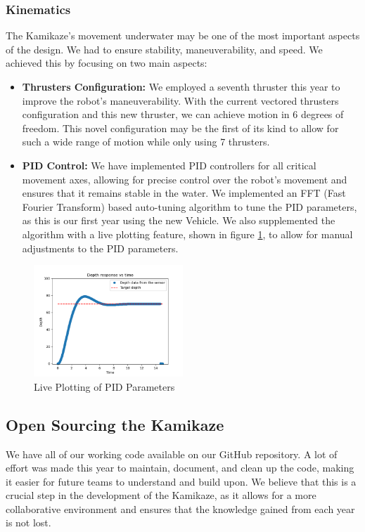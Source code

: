 \subsubsection{Kinematics}
The Kamikaze's movement underwater may be one of the most important aspects of
the design. We had to ensure stability, maneuverability, and speed. We achieved
this by focusing on two main aspects:
\begin{itemize}
        
    \item \textbf{Thrusters Configuration:} We employed a seventh thruster this year to
        improve the robot's maneuverability. With the current vectored thrusters
        configuration and this new thruster, we can achieve motion in 6 degrees of freedom.
        This novel configuration may be the first of its kind to allow for such a wide range of motion while only using 7 thrusters.

        \item \textbf{PID Control:} We have implemented PID controllers for all critical movement axes, allowing for
        precise control over the robot's movement and ensures that it remains stable in the water. We implemented an FFT (Fast Fourier Transform)
        based auto-tuning algorithm to tune the PID parameters, as this is our first year using the new Vehicle. We also supplemented the algorithm with a live
        plotting feature, shown in figure \ref{fig:pid_live},
         to allow for manual adjustments to the PID parameters.
\end{itemize}
\begin{figure}[h]
    \centering
    \includegraphics[width=0.5\textwidth]{Sections/3Design&Manufacturing/tex/Software/images/Pid.png}
    \caption{Live Plotting of PID Parameters}
    \label{fig:pid_live}
\end{figure}

\subsection{Open Sourcing the Kamikaze}
We have all of our working code available on our GitHub repository. A lot of effort
was made this year to maintain, document, and clean up the code, making it easier
for future teams to understand and build upon. We believe that this is a crucial
step in the development of the Kamikaze, as it allows for a more collaborative
environment and ensures that the knowledge gained from each year is not lost. 

